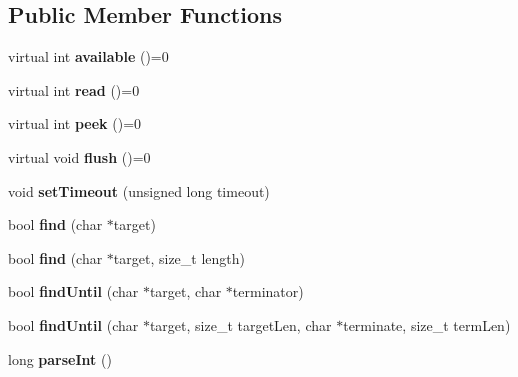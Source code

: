 \subsection*{Public Member Functions}
\begin{DoxyCompactItemize}
\item 
\hypertarget{class_stream_a9c98a763395005c08ce95afb2f06c7b1}{}virtual int {\bfseries available} ()=0\label{class_stream_a9c98a763395005c08ce95afb2f06c7b1}

\item 
\hypertarget{class_stream_aea5dee9fcb038148515b7c9212d38dc0}{}virtual int {\bfseries read} ()=0\label{class_stream_aea5dee9fcb038148515b7c9212d38dc0}

\item 
\hypertarget{class_stream_a30c3c212ec6ea67277a708c5ea2501a5}{}virtual int {\bfseries peek} ()=0\label{class_stream_a30c3c212ec6ea67277a708c5ea2501a5}

\item 
\hypertarget{class_stream_aa3ef2c34f152a0b2ea8de9139b9461da}{}virtual void {\bfseries flush} ()=0\label{class_stream_aa3ef2c34f152a0b2ea8de9139b9461da}

\item 
\hypertarget{class_stream_a851dd6dc74d52389de04f99648478db5}{}void {\bfseries set\+Timeout} (unsigned long timeout)\label{class_stream_a851dd6dc74d52389de04f99648478db5}

\item 
\hypertarget{class_stream_a4bab30ccd324efd461dee46a2339f673}{}bool {\bfseries find} (char $\ast$target)\label{class_stream_a4bab30ccd324efd461dee46a2339f673}

\item 
\hypertarget{class_stream_ad851401f2318cdb1de05707e021b81d9}{}bool {\bfseries find} (char $\ast$target, size\+\_\+t length)\label{class_stream_ad851401f2318cdb1de05707e021b81d9}

\item 
\hypertarget{class_stream_ad1f5f6600832396fb38a897baf4de35b}{}bool {\bfseries find\+Until} (char $\ast$target, char $\ast$terminator)\label{class_stream_ad1f5f6600832396fb38a897baf4de35b}

\item 
\hypertarget{class_stream_a3a9497de614792103ab8cb4759e01a69}{}bool {\bfseries find\+Until} (char $\ast$target, size\+\_\+t target\+Len, char $\ast$terminate, size\+\_\+t term\+Len)\label{class_stream_a3a9497de614792103ab8cb4759e01a69}

\item 
\hypertarget{class_stream_a497ffcbcb4d5bb889a8fde487bcc1b98}{}long {\bfseries parse\+Int} ()\label{class_stream_a497ffcbcb4d5bb889a8fde487bcc1b98}


\end{DoxyCompactItemize}
